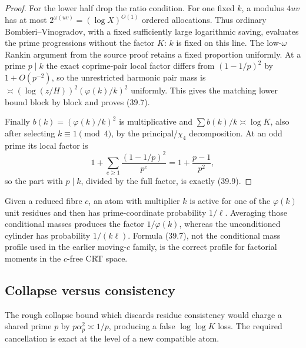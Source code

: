 \documentclass[10pt,reqno]{amsart}
\theoremstyle{definition}
\newcommand{\1}{\mathbf 1}
\begin{document}
\begin{proof}
For the lower half drop the ratio condition.  For one fixed $k$, a modulus
$4uv$ has at most $2^{\omega(uv)}=(\log X)^{O(1)}$ ordered allocations.
Thus ordinary Bombieri--Vinogradov, with a fixed sufficiently large
logarithmic saving, evaluates the prime progressions without the factor
$K$: $k$ is fixed on this line.  The low-$\omega$ Rankin argument from the
source proof retains a fixed proportion uniformly.  At a prime $p\mid k$
the exact coprime-pair local factor differs from $(1-1/p)^2$ by
$1+O(p^{-2})$, so the unrestricted harmonic pair mass is
$\asymp(\log(z/H))^2(\varphi(k)/k)^2$ uniformly.  This gives the matching
lower bound block by block and proves (39.7).

Finally $b(k)=(\varphi(k)/k)^2$ is multiplicative and
$\sum b(k)/k\asymp\log K$, also after selecting $k\equiv1\pmod4$, by the
principal/$\chi_4$ decomposition.  At an odd prime its local factor is
\begin{equation}\tag{39.12}
 1+\sum_{e\geq1}\frac{(1-1/p)^2}{p^e}=1+\frac{p-1}{p^2},
\end{equation}
so the part with $p\mid k$, divided by the full factor, is exactly (39.9).
\end{proof}

Given a reduced fibre $c$, an atom with multiplier $k$ is active for one of
the $\varphi(k)$ unit residues and then has prime-coordinate probability
$1/\ell$.  Averaging those conditional masses produces the factor
$1/\varphi(k)$, whereas the unconditioned cylinder has probability
$1/(k\ell)$.  Formula (39.7), not the conditional mass profile used in the
earlier moving-$c$ family, is the correct profile for factorial moments in
the $c$-free CRT space.

\subsection{Collapse versus consistency}
The rough collapse bound which discards residue consistency would charge a
shared prime $p$ by $p\alpha_p^2\asymp1/p$, producing a false
$\log\log K$ loss.  The required cancellation is exact at the level of a
new compatible atom.
\end{document}
